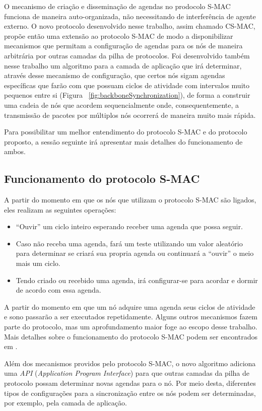 O mecanismo de criação e disseminação de agendas no prodocolo S-MAC funciona de maneira auto-organizada, não necessitando de interferência de agente externo. O novo protocolo desenvolvido nesse trabalho, assim chamado CS-MAC, propõe então uma extensão ao protocolo S-MAC de modo a disponibilizar mecanismos que permitam a configuração de agendas para os nós de maneira arbitrária por outras camadas da pilha de protocolos. Foi desenvolvido também nesse trabalho um algoritmo para a camada de aplicação que irá determinar, através desse mecanismo de configuração,  que certos nós sigam agendas específicas que farão com que possuam ciclos de atividade com intervalos muito pequenos entre si (Figura ~\ref{fig:backboneSynchronization}), de forma a construir uma cadeia de nós que acordem sequencialmente onde, consequentemente, a transmissão de pacotes por múltiplos nós ocorrerá de maneira muito mais rápida.

Para possibilitar um melhor entendimento do protocolo S-MAC e do protocolo proposto, a sessão seguinte irá apresentar mais detalhes do funcionamento de ambos.

\subsection{Funcionamento do protocolo S-MAC}

A partir do momento em que os nós que utilizam o protocolo S-MAC são ligados, eles realizam as seguintes operações:

\begin{itemize}
	\item ``Ouvir'' um ciclo inteiro esperando receber uma agenda que possa seguir.
	\item Caso não receba uma agenda, fará um teste utilizando um valor aleatório para determinar se criará sua propria agenda ou continuará a ``ouvir'' o meio mais um ciclo.
	\item Tendo criado ou recebido uma agenda, irá configurar-se para acordar e dormir de acordo com essa agenda.
\end{itemize}

A partir do momento em que um nó adquire uma agenda seus ciclos de atividade e sono passarão a ser executados repetidamente. Alguns outros mecanismos fazem parte do protocolo, mas um aprofundamento maior foge ao escopo desse trabalho. Mais detalhes sobre o funcionamento do protocolo S-MAC podem ser encontrados em \cite{ye04}. 

Além dos mecanismos providos pelo protocolo S-MAC, o novo algoritmo adiciona uma \emph{API} (\emph{Application Program Interface}) para que outras camadas da pilha de protocolo possam determinar novas agendas para o nó. Por meio desta, diferentes tipos de configurações para a sincronização entre os nós podem ser determinadas, por exemplo, pela camada de aplicação.


